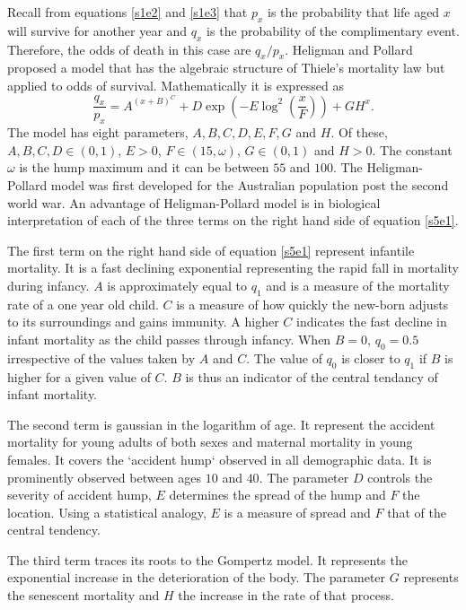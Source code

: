 \documentclass{article}
\numberwithin{equation}{section}
\begin{document}
Recall from equations \eqref{s1e2} and \eqref{s1e3} that $p_x$ is the 
probability that life aged $x$ will survive for another year and $q_x$ is
the probability of the complimentary event. Therefore, the odds of death in 
this case are $q_x/p_x$.  Heligman and Pollard \cite{heligman1980age} proposed 
a model that has the algebraic structure of Thiele's mortality law but 
applied to odds of survival. Mathematically it is expressed as
\begin{equation}\label{s5e1}
\frac{q_x}{p_x} = A^{(x+B)^C}+
D\exp\left(-E\log^2\left(\frac{x}{F}\right)\right) + GH^x.
\end{equation}
The model has eight parameters, $A, B, C, D, E, F, G$ and $H$. Of these, $A,
B, C, D \in (0, 1)$, $E > 0$, $F \in (15, \omega)$, $G \in (0, 1)$ and $H
> 0$. The constant $\omega$ is the hump maximum and it can be between $55$
and $100$. The Heligman-Pollard model was first developed for the Australian
population post the second world war. An advantage of Heligman-Pollard model 
is in biological interpretation of each of the three terms on the right hand 
side of equation \eqref{s5e1}.

The first term on the right hand side of equation \eqref{s5e1} represent 
infantile mortality. It is a fast declining exponential representing the 
rapid fall in mortality during infancy. $A$ is approximately equal to $q_1$ 
and is a measure of the mortality rate of a one year old child. $C$ is a 
measure of how quickly the new-born adjusts to its surroundings and gains 
immunity. A higher $C$ indicates the fast decline in infant mortality as the
child passes through infancy. When $B = 0$, $q_0 = 0.5$ irrespective of the
values taken by $A$ and $C$. The value of $q_0$ is closer to $q_1$ if $B$ is
higher for a given value of $C$. $B$ is thus an indicator of the central 
tendancy of infant mortality. 

The second term is gaussian in the logarithm of age. It represent the accident
mortality for young adults of both sexes and maternal mortality in young 
females. It covers the `accident hump` observed in all demographic data. It
is prominently observed between ages $10$ and $40$. The parameter $D$ controls 
the severity of accident hump, $E$ determines the spread of the hump and $F$ 
the location.  Using a statistical analogy, $E$ is a measure of spread and 
$F$ that of the central tendency. 

The third term traces its roots to the Gompertz model. It represents the
exponential increase in the deterioration of the body. The parameter $G$ 
represents the senescent mortality and $H$ the increase in the rate of that
process.



\end{document}
